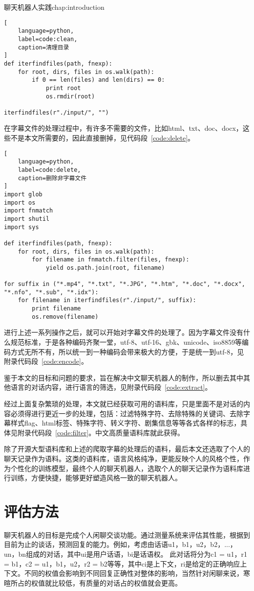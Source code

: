 \begin{cuzchapter}{聊天机器人实践}{chap:introduction}
\begin{lstlisting}[
    language=python,
    label=code:clean,
    caption=清理目录
]
def iterfindfiles(path, fnexp):
    for root, dirs, files in os.walk(path):
        if 0 == len(files) and len(dirs) == 0:
            print root
            os.rmdir(root)

iterfindfiles(r"./input/", "")
\end{lstlisting}

在字幕文件的处理过程中，有许多不需要的文件，比如html、txt、doc、docx，这些不是本文所需要的，因此直接删掉，见代码段~\ref{code:delete}。
\begin{lstlisting}[
    language=python,
    label=code:delete,
    caption=删除非字幕文件
]
import glob
import os
import fnmatch
import shutil
import sys

def iterfindfiles(path, fnexp):
    for root, dirs, files in os.walk(path):
        for filename in fnmatch.filter(files, fnexp):
            yield os.path.join(root, filename)

for suffix in ("*.mp4", "*.txt", "*.JPG", "*.htm", "*.doc", "*.docx", "*.nfo", "*.sub", "*.idx"):
    for filename in iterfindfiles(r"./input/", suffix):
        print filename
        os.remove(filename)
\end{lstlisting}

进行上述一系列操作之后，就可以开始对字幕文件的处理了。因为字幕文件没有什么规范标准，于是各种编码齐聚一堂，utf-8、utf-16、gbk、unicode、iso8859等编码方式无所不有，所以统一到一种编码会带来极大的方便，于是统一到utf-8，见附录代码段~\ref{code:encode}。

鉴于本文的目标和问题的要求，旨在解决中文聊天机器人的制作，所以删去其中其他语言的对话内容，进行语言的筛选，见附录代码段~\ref{code:extract}。

经过上面复杂繁琐的处理，本文就已经获取可用的语料库，只是里面不是对话的内容必须得进行更近一步的处理，包括：过滤特殊字符、去除特殊的关键词、去除字幕样式flag、html标签、特殊字符、转义字符、剧集信息等等各式各样的标志，具体见附录代码段~\ref{code:filter}。中文高质量语料库就此获得。

除了开源大型语料库和上述的爬取字幕的处理后的语料，最后本文还选取了个人的聊天记录作为语料。这类的语料库，语言风格纯净，更能反映个人的风格个性，作为个性化的训练模型，最终个人的聊天机器人，选取个人的聊天记录作为语料库进行训练，方便快捷，能够更好塑造风格一致的聊天机器人。
\section{评估方法}\label{sec:background}
聊天机器人的目标是完成个人闲聊交谈功能。通过测量系统来评估其性能，根据到目前为止的谈话，预测回复的能力。例如，考虑由话语{u1，b1，u2，b2，...，un，bn}组成的对话，其中ui是用户话语，bi是话语权。 此对话将分为c1 = {u1}，r1 = {b1}，c2 = {u1，b1，u2}，r2 = {b2}等等，其中ci是上下文，ri是给定的正确响应上下文。不同的权值会影响到不同回复正确性对整体的影响，当然针对闲聊来说，寒暄所占的权值就比较低，有质量的对话占的权值就会更高。


\end{cuzchapter}
